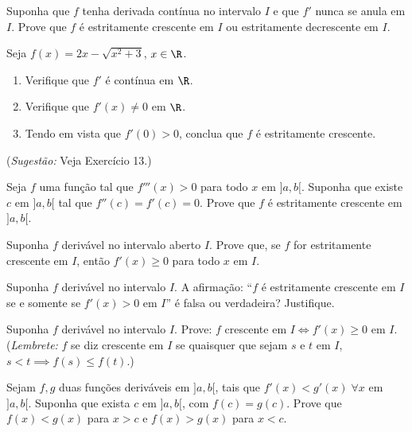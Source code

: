 \begin{exercicio}[13]
Suponha que $f$ tenha derivada contínua no intervalo $I$ e que $f'$ nunca se anula em $I$. Prove que $f$ é estritamente crescente em $I$ ou estritamente decrescente em $I$.
\end{exercicio}

\begin{exercicio}[14]
Seja $f(x) = 2x - \sqrt{x^2 + 3}$, $x \in \R$.
\begin{enumerate}[label=\alph*)]
    \item Verifique que $f'$ é contínua em $\R$.
    \item Verifique que $f'(x) \neq 0$ em $\R$.
    \item Tendo em vista que $f'(0) > 0$, conclua que $f$ é estritamente crescente.
\end{enumerate}
(\textit{Sugestão:} Veja Exercício 13.)
\end{exercicio}

\begin{exercicio}[15]
Seja $f$ uma função tal que $f'''(x) > 0$ para todo $x$ em ${]a, b[}$. Suponha que existe $c$ em ${]a, b[}$ tal que $f''(c) = f'(c) = 0$. Prove que $f$ é estritamente crescente em ${]a, b[}$.
\end{exercicio}

\begin{exercicio}[16]
Suponha $f$ derivável no intervalo aberto $I$. Prove que, se $f$ for estritamente crescente em $I$, então $f'(x) \ge 0$ para todo $x$ em $I$.
\end{exercicio}

\begin{exercicio}[17]
Suponha $f$ derivável no intervalo $I$. A afirmação: ``$f$ é estritamente crescente em $I$ se e somente se $f'(x) > 0$ em $I$'' é falsa ou verdadeira? Justifique.
\end{exercicio}

\begin{exercicio}[18]
Suponha $f$ derivável no intervalo $I$. Prove: $f$ crescente em $I \iff f'(x) \ge 0$ em $I$.\\
(\textit{Lembrete:} $f$ se diz crescente em $I$ se quaisquer que sejam $s$ e $t$ em $I$, $s < t \implies f(s) \le f(t)$.)
\end{exercicio}

\begin{exercicio}[19]
Sejam $f, g$ duas funções deriváveis em ${]a, b[}$, tais que $f'(x) < g'(x)\; \forall x$ em ${]a, b[}$. Suponha que exista $c$ em ${]a, b[}$, com $f(c) = g(c)$. Prove que $f(x) < g(x)$ para $x > c$ e $f(x) > g(x)$ para $x < c$.
\end{exercicio}


